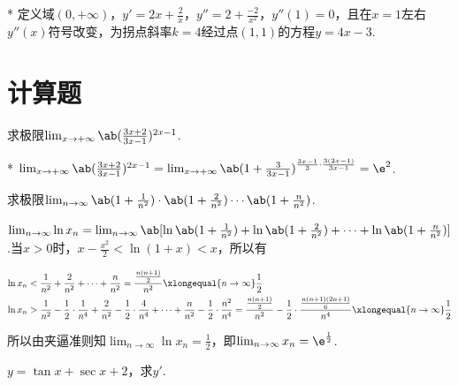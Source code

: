 \begin{solution}*
        定义域$(0,+\infty)$，$y'=2x+\frac{2}{x}$，$y''=2+\frac{-2}{x^2}$，$y''(1)=0$，且在$x=1$左右$y''(x)$符号改变，为拐点斜率$k=4$经过点$(1,1)$的方程$y=4x-3$.
\end{solution}

\newpage
\section{计算题}
\begin{problem}
	求极限$\lim_{x\to +\infty} \ab( \frac{3x+2}{3x-1} ) ^{2x-1}$.
\end{problem}
\begin{draft}
        \vspace{3em}
\end{draft}
\begin{solution}*
        $\lim_{x\to +\infty} \ab( \frac{3x+2}{3x-1} ) ^{2x-1}=\lim_{x\to +\infty} \ab( 1+\frac{3}{3x-1} ) ^{\frac{3x-1}{3}\cdot \frac{3( 2x-1 )}{3x-1}}=\e^2$.
\end{solution}
\begin{problem}
	求极限$\lim_{n\to \infty} \ab( 1+\frac{1}{n^2} ) \cdot \ab( 1+\frac{2}{n^2} ) \cdots \ab( 1+\frac{n}{n^2} )$.
\end{problem}
\begin{draft}
        \vspace{3em}
\end{draft}
\begin{solution}
	$\lim_{n\to \infty} \ln x_n=\lim_{n\to \infty} \ab[ \ln \ab( 1+\frac{1}{n^2} ) +\ln \ab( 1+\frac{2}{n^2} ) +\cdots +\ln \ab( 1+\frac{n}{n^2} ) ]$.当$x>0$时，$x-\frac{x^2}{2}<\ln ( 1+x ) <x$，所以有

	\[\begin{aligned}
		\ln x_n&<\frac{1}{n^2}+\frac{2}{n^2}+\cdots+\frac{n}{n^2}=\frac{\frac{n(n+1)}{2}}{n^2}\xlongequal{n\to\infty}\frac{1}{2}\\
		\ln x_n&>\frac{1}{n^2}-\frac{1}{2} \cdot \frac{1}{n^4}+\frac{2}{n^2}-\frac{1}{2} \cdot \frac{4}{n^4}+\cdots+\frac{n}{n^2}-\frac{1}{2} \cdot \frac{n^2}{n^4}=\frac{\frac{n(n+1)}{2}}{n^2}-\frac{1}{2} \cdot \frac{\frac{n(n+1)(2 n+1)}{6}}{n^4}\xlongequal{n\to\infty}\frac{1}{2}
	\end{aligned}\]

	所以由夹逼准则知$\lim_{n\to \infty} \ln x_n=\frac{1}{2}$，即$\lim_{n\to \infty} x_n=\e^{\frac{1}{2}}$.
\end{solution}
\begin{problem}
	$y=\tan x+\sec x+2$，求$y'$.
\end{problem}
